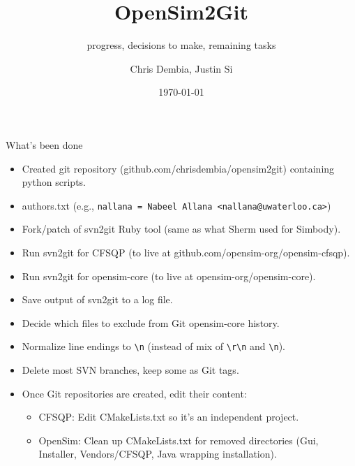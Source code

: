 \documentclass[pdf, 8pt]{beamer}
\title{OpenSim2Git}
\subtitle{progress, decisions to make, remaining tasks}
\author{Chris Dembia, Justin Si}
\date{\today}
\begin{document}
\begin{frame}
\maketitle

\end{frame}

\begin{frame}[fragile]{What's been done}

\begin{itemize}
\item Created git repository (github.com/chrisdembia/opensim2git) containing
    python scripts.
\item authors.txt (e.g., \verb|nallana = Nabeel Allana <nallana@uwaterloo.ca>|)
\item Fork/patch of svn2git Ruby tool (same as what Sherm used for Simbody).
\item Run svn2git for CFSQP (to live at github.com/opensim-org/opensim-cfsqp).
\item Run svn2git for opensim-core (to live at opensim-org/opensim-core).
\item Save output of svn2git to a log file.
\item Decide which files to exclude from Git opensim-core history.
\item Normalize line endings to \verb|\n| (instead of mix of \verb|\r\n| and
\verb|\n|).
\item Delete most SVN branches, keep some as Git tags.
\item Once Git repositories are created, edit their content:
    \begin{itemize}
    \item CFSQP: Edit CMakeLists.txt so it's an independent project.
    \item OpenSim: Clean up CMakeLists.txt for removed directories (Gui, Installer,
    Vendors/CFSQP, Java wrapping installation).
    \end{itemize}
\end{itemize}
\end{frame}
\end{document}

